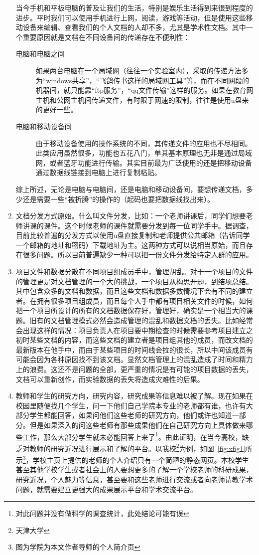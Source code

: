 \begin{enumerate}
当今手机和平板电脑的普及让我们的生活，特别是娱乐生活得到来很到程度的进步。平时我们可以使用手机进行上网，阅读，游戏等活动，但是使用这些移动设备来编辑、查看我们的个人文档的人却不多，尤其是学术性文档。其中一个重要原因就是文档在不同设备间的传递存在不便利性：
  \begin{description}
  \item[电脑和电脑之间] 如果两台电脑在一个局域网（往往一个实验室内），采取的传递方法多为“windows共享”，“飞鸽传书这样的局域网工具”等，而在不同网段的机器间，就只能靠“ftp服务”，“qq文件传输”这样的服务。如果在教育网主机和公网主机间传递文件，有时限于网速的限制，往往是使用u盘来的更好一些。
  \item[电脑和移动设备间] 由于移动设备使用的操作系统的不同，其传递文件的应用也不尽相同。此类应用虽然很多，功能也五花八门，单其基本原理也无非是通过局域网，或者蓝牙功能进行传输。其实目前最为广泛使用的还是把移动设备通过数据线链接到电脑上进行复制粘贴。
  \end{description}
综上所述，无论是电脑与电脑间，还是电脑和移动设备间，要想传递文档，多少还是需要一些“被折腾”的操作的（起码也要把数据线找出来）。
\item 文档分发方式原始。什么叫文件分发，比如：一个老师讲课后，同学们想要老师讲课的课件。这个时候老师的课件就需要分发到每一位同学手中。据调查，目前比较普遍的分发方式以使用u盘直接复制和老师提供公共邮箱（告诉同学一个邮箱的地址和密码）下载地址为主。这两种方式可以说相当原始，而且存在很多问题。所以目前普遍缺少一种可以把一份文件分发给特定人群的应用。
\item 项目文件和数据分散在不同项目组成员手中，管理胡乱。对于一个项目的文件的管理更是对文档管理的一个大的挑战，一个项目从构思开题，到结项总结。其中包含众多的文档和数据，而且这些文档和数据多数情况下会有不同的建立者。在拥有很多项目组成员，而且每个人手中都有项目相关文件的时候，如何把一个项目所设计的所有的文档数据保存好，管理好，确实是一个相当大的课题。旧有的文档管理模式必然会造成管理的混乱和数据文档的丢失。比如经常会出现这样的情况：项目负责人在项目要中期检查的时候需要参考项目建立之初时某些文档的内容，而这些文档的建立者是项目组其他的成员，而改文档的最新版本在他手中，而由于某些项目的时间线会拉的很长，所以中间该成员有可能会因为各种原因找不到该文档。显然文档管理上的混乱造成了时间和精力上的浪费。这还不是问题的全部，更严重的情况是有可能的项目数据的丢失，文档可以重新创作，而实验数据的丢失将造成灾难性的后果。
\item 教师和学生的研究方向，研究内容，研究成果等信息难以被了解。现在如果在校园里随便找几个学生，问一下他们自己学院本专业的老师都有谁，也许有大部分学生都能回答，如果问他们这些老师的研究方向，他们或许也知道一部分。但是如果深入的问这些老师有那些成果他们在自己研究方向上具体做来哪些工作，那么大部分学生就未必能回答上来了\footnote{对此问题并没有做科学的调查统计，此处结论可能有误}。由此证明，在当今高校，缺乏对教师的研究近况进行展示和了解的平台。以我校\footnote{天津大学}为例，如图~\ref{fig:xfig1}所示\footnote{图为学院为本文作者导师的个人简介页}，学校主页上提供的老师的个人介绍只有一个简陋的静态网页。本校学生甚至其他学校学生或者社会上的人要想更多的了解一个学校老师的科研成果，研究近况，个人魅力等信息，甚至要和这些老师进行交流或者向老师请教学术问题，就需要建立更强大的成果展示平台和学术交流平台。

\end{enumerate}
